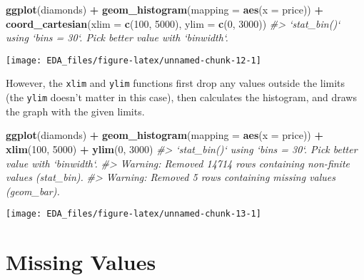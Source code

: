 \documentclass[]{book}
\newenvironment{Shaded}{\begin{snugshade}}{\end{snugshade}}
\newcommand{\CommentTok}[1]{\textcolor[rgb]{0.56,0.35,0.01}{\textit{#1}}}
\newcommand{\DataTypeTok}[1]{\textcolor[rgb]{0.13,0.29,0.53}{#1}}
\newcommand{\DecValTok}[1]{\textcolor[rgb]{0.00,0.00,0.81}{#1}}
\newcommand{\KeywordTok}[1]{\textcolor[rgb]{0.13,0.29,0.53}{\textbf{#1}}}
\newcommand{\NormalTok}[1]{#1}
\newcommand{\OperatorTok}[1]{\textcolor[rgb]{0.81,0.36,0.00}{\textbf{#1}}}
\newcommand{\StringTok}[1]{\textcolor[rgb]{0.31,0.60,0.02}{#1}}
\theoremstyle{plain}
\theoremstyle{remark}
\theoremstyle{definition}
\theoremstyle{definition}
\theoremstyle{definition}
\theoremstyle{remark}
\begin{document}
\begin{Shaded}
\begin{Highlighting}[]
\KeywordTok{ggplot}\NormalTok{(diamonds) }\OperatorTok{+}
\StringTok{  }\KeywordTok{geom_histogram}\NormalTok{(}\DataTypeTok{mapping =} \KeywordTok{aes}\NormalTok{(}\DataTypeTok{x =}\NormalTok{ price)) }\OperatorTok{+}
\StringTok{  }\KeywordTok{coord_cartesian}\NormalTok{(}\DataTypeTok{xlim =} \KeywordTok{c}\NormalTok{(}\DecValTok{100}\NormalTok{, }\DecValTok{5000}\NormalTok{), }\DataTypeTok{ylim =} \KeywordTok{c}\NormalTok{(}\DecValTok{0}\NormalTok{, }\DecValTok{3000}\NormalTok{))}
\CommentTok{#> `stat_bin()` using `bins = 30`. Pick better value with `binwidth`.}
\end{Highlighting}
\end{Shaded}

\begin{center}\texttt{[image: EDA\_files/figure-latex/unnamed-chunk-12-1]} \end{center}

However, the \texttt{xlim} and \texttt{ylim} functions first drop any
values outside the limits (the \texttt{ylim} doesn't matter in this
case), then calculates the histogram, and draws the graph with the given
limits.

\begin{Shaded}
\begin{Highlighting}[]
\KeywordTok{ggplot}\NormalTok{(diamonds) }\OperatorTok{+}
\StringTok{  }\KeywordTok{geom_histogram}\NormalTok{(}\DataTypeTok{mapping =} \KeywordTok{aes}\NormalTok{(}\DataTypeTok{x =}\NormalTok{ price)) }\OperatorTok{+}
\StringTok{  }\KeywordTok{xlim}\NormalTok{(}\DecValTok{100}\NormalTok{, }\DecValTok{5000}\NormalTok{) }\OperatorTok{+}
\StringTok{  }\KeywordTok{ylim}\NormalTok{(}\DecValTok{0}\NormalTok{, }\DecValTok{3000}\NormalTok{)}
\CommentTok{#> `stat_bin()` using `bins = 30`. Pick better value with `binwidth`.}
\CommentTok{#> Warning: Removed 14714 rows containing non-finite values (stat_bin).}
\CommentTok{#> Warning: Removed 5 rows containing missing values (geom_bar).}
\end{Highlighting}
\end{Shaded}

\begin{center}\texttt{[image: EDA\_files/figure-latex/unnamed-chunk-13-1]} \end{center}

\hypertarget{missing-values}{%
\section{Missing Values}\label{missing-values}}
\end{document}
